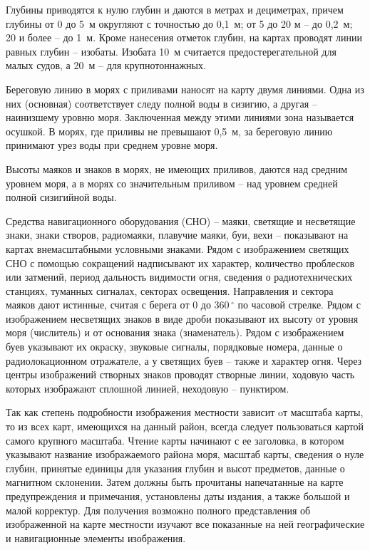 \documentclass[a4paper, 12pt, twoside, final, book, russian, fittopage, cyremdash]{ncc}
\newcommand{\gr}{\ensuremath{\,^\circ}\xspace}
\begin{document}
Глубины приводятся к нулю глубин и даются в метрах и дециметрах, причем глубины от 0 до 5~м округляют с точностью до 0,1~м; от 5 до 20 м \--- до 0,2~м; 20 и более \--- до 1~м. Кроме нанесения отметок глубин, на картах проводят линии равных глубин \--- изобаты. Изобата 10~м считается предостерегательной для малых судов, а 20~м \--- для крупнотоннажных. 

Береговую линию в морях с приливами наносят на карту двумя линиями. Одна из них (основная) соответствует следу полной воды в сизигию, а другая \--- наинизшему уровню моря. Заключенная между этими линиями зона называется осушкой. В морях, где приливы не превышают 0,5~м, за береговую линию принимают урез воды при среднем уровне моря. 

Высоты маяков и знаков в морях, не имеющих приливов, даются над средним уровнем моря, а в морях со значительным приливом \--- над уровнем средней полной сизигийной воды. 

Средства навигационного оборудования (СНО) \--- маяки, светящие и несветящие знаки, знаки створов, радиомаяки, плавучие маяки, буи, вехи \--- показывают на картах внемасштабными условными знаками. Рядом с изображением светящих СНО с помощью сокращений надписывают их характер, количество проблесков или затмений, период дальность видимости огня, сведения о радиотехнических станциях, туманных сигналах, секторах освещения. Направления и сектора маяков дают истинные, считая с берега от 0 до 360\gr по часовой стрелке. Рядом с изображением несветящих знаков в виде дроби показывают их высоту от уровня моря (числитель) и от основания знака (знаменатель). Рядом с изображением буев указывают их окраску, звуковые сигналы, порядковые номера, данные о радиолокационном отражателе, а у светящих буев \--- также и характер огня. Через центры изображений створных знаков проводят створные линии, ходовую часть которых изображают сплошной линией, неходовую \--- пунктиром. 

Так как степень подробности изображения местности зависит oт масштаба карты, то из всех карт, имеющихся на данный район, всегда следует пользоваться картой самого крупного масштаба. Чтение карты начинают с ее заголовка, в котором указывают название изображаемого района моря, масштаб карты, сведения о нуле глубин, принятые единицы для указания глубин и высот предметов, данные о магнитном склонении. Затем должны быть прочитаны напечатанные на карте предупреждения и примечания, установлены даты издания, а также большой и малой корректур. Для получения возможно полного представления об изображенной на карте местности изучают все показанные на ней географические и навигационные элементы изображения. 
\end{document}
